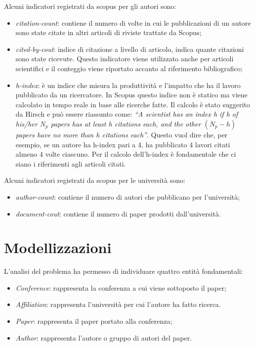 Alcuni indicatori registrati da scopus per gli autori sono:
\begin{itemize}
  \item \textit{citation-count}: contiene il numero di volte in cui le pubblicazioni di un autore sono state citate in altri articoli 
  di riviste trattate da Scopus;
  \item \textit{cited-by-cout}: indice di citazione a livello di articolo, indica quante citazioni sono state ricevute. 
  Questo indicatore viene utilizzato anche per articoli scientifici e il conteggio viene riportato accanto al riferimento bibliografico;
  \item \textit{h-index}: è un indice che misura la produttività e l'impatto che ha il lavoro pubblicato da un ricercatore. 
  In Scopus questo indice non è statico ma viene calcolato in tempo reale in base alle ricerche fatte. 
  Il calcolo è stato suggerito da Hirsch e può essere riassunto come: 
  \textit{“A scientist has an index h if h of his/her \(N_p\) papers has at least h citations each, and the other \((N_p - h)\) 
  papers have no more than h citations each”}. Questo vuol dire che, per esempio, se un autore ha h-index pari a 4, ha pubblicato 4 lavori 
  citati almeno 4 volte ciascuno.
  Per il calcolo dell’h-index è fondamentale che ci siano i riferimenti agli articoli citati.
\end{itemize}

Alcuni indicatori registrati da scopus per le università sono:
\begin{itemize}
    \item \textit{author-count}: contiene il numero di autori che pubblicano per l'università;
    \item \textit{document-cout}: contiene il numero di paper prodotti dall'università.
  \end{itemize}



\section{Modellizzazioni}
L'analisi del problema ha permesso di individuare quattro entità fondamentali:

\begin{itemize}
    \item \textit{Conference}: rappresenta la conferenza a cui viene sottoposto il paper;
    \item \textit{Affiliation}: rappresenta l'università per cui l'autore ha fatto ricerca. 
    \item \textit{Paper}: rappresenta il paper portato alla conferenza;
    \item \textit{Author}: rappresenta l'autore o gruppo di autori del paper. 
\end{itemize}


